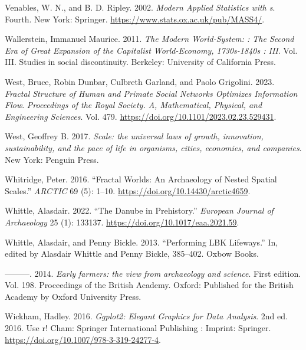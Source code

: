 \documentclass[
  12pt,
  a4paper, twoside]{book}
\newlength{\cslhangindent}
\newlength{\cslentryspacingunit} %
\newenvironment{CSLReferences}[2] %
 {%
  \setlength{\parindent}{0pt}
  \ifodd #1
  \let\oldpar\par
  \def\par{\hangindent=\cslhangindent\oldpar}
  \fi
  \setlength{\parskip}{#2\cslentryspacingunit}
 }%
 {}
\begin{document}
\begin{CSLReferences}{1}{0}
\leavevmode{}%
Venables, W. N., and B. D. Ripley. 2002. \emph{Modern Applied Statistics with s}. Fourth. New York: Springer. \url{https://www.stats.ox.ac.uk/pub/MASS4/}.

\leavevmode{}%
Wallerstein, Immanuel Maurice. 2011. \emph{The Modern World-System: : The Second Era of Great Expansion of the Capitalist World-Economy, 1730s-1840s : III}. Vol. III. Studies in social discontinuity. Berkeley: University of California Press.

\leavevmode{}%
West, Bruce, Robin Dunbar, Culbreth Garland, and Paolo Grigolini. 2023. \emph{Fractal Structure of Human and Primate Social Networks Optimizes Information Flow}. \emph{Proceedings of the Royal Society. A, Mathematical, Physical, and Engineering Sciences}. Vol. 479. \url{https://doi.org/10.1101/2023.02.23.529431}.

\leavevmode{}%
West, Geoffrey B. 2017. \emph{Scale: the universal laws of growth, innovation, sustainability, and the pace of life in organisms, cities, economies, and companies}. New York: Penguin Press.

\leavevmode{}%
Whitridge, Peter. 2016. {``Fractal Worlds: An Archaeology of Nested Spatial Scales.''} \emph{ARCTIC} 69 (5): 1--10. \url{https://doi.org/10.14430/arctic4659}.

\leavevmode{}%
Whittle, Alasdair. 2022. {``The Danube in Prehistory.''} \emph{European Journal of Archaeology} 25 (1): 133137. \url{https://doi.org/10.1017/eaa.2021.59}.

\leavevmode{}%
Whittle, Alasdair, and Penny Bickle. 2013. {``Performing LBK Lifeways.''} In, edited by Alasdair Whittle and Penny Bickle, 385--402. Oxbow Books.

\leavevmode{}%
---------. 2014. \emph{Early farmers: the view from archaeology and science}. First edition. Vol. 198. Proceedings of the British Academy. Oxford: Published for the British Academy by Oxford University Press.

\leavevmode{}%
Wickham, Hadley. 2016. \emph{Ggplot2: Elegant Graphics for Data Analysis}. 2nd ed. 2016. Use r! Cham: Springer International Publishing : Imprint: Springer. \url{https://doi.org/10.1007/978-3-319-24277-4}.


\end{CSLReferences}
\end{document}
